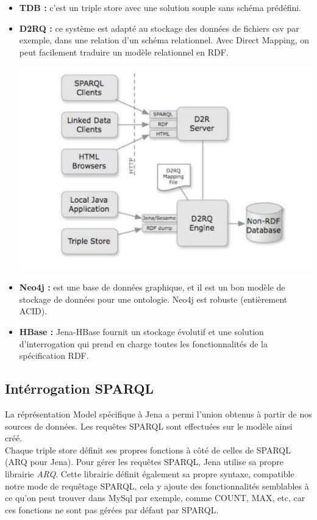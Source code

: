 \documentclass{article}
\begin{document}
\begin{itemize}
\item \textbf{TDB :} c'est un triple store avec une solution souple sans schéma prédéfini. 
\item \textbf{D2RQ : } ce système est adapté au stockage des données de fichiers csv par exemple, dans une relation d'un schéma relationnel. Avec Direct Mapping, on peut facilement traduire un modèle relationnel en RDF.\\
\begin{center}
\includegraphics[scale=0.5]{archi_D2RQ.jpeg} 
\label{fig_d2rq}
\end{center}

\item \textbf{Neo4j :} est une base de données graphique, et il est un bon modèle de stockage de données pour une ontologie. Neo4j est robuste (entièrement ACID).



\item \textbf{HBase :} Jena-HBase fournit un stockage évolutif et une solution d'interrogation qui prend en charge toutes les fonctionnalités de la spécification RDF.


\end{itemize}



\subsection{Intérrogation SPARQL}
La réprésentation Model spécifique à Jena a permi l'union obtenus à partir de nos sources de données. Les requêtes SPARQL sont effectuées sur le modèle ainsi créé.\\
Chaque triple store définit ses propres fonctions à côté de celles de SPARQL (ARQ pour Jena). Pour gérer les requêtes SPARQL, Jena utilise sa propre librairie \textit{ARQ}. Cette librairie définit également sa propre syntaxe, compatible notre mode de requêtage SPARQL, cela y ajoute des fonctionnalités semblables à ce qu'on peut trouver dans MySql par exemple, comme COUNT, MAX, etc, car ces fonctions ne sont pas gérées par défaut par SPARQL.
\end{document}
